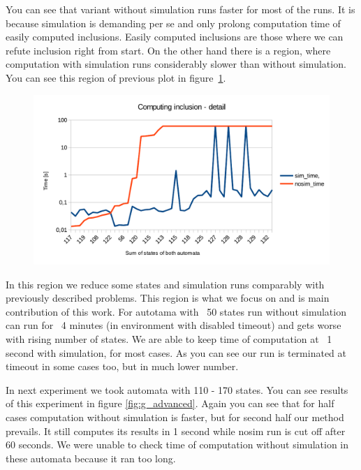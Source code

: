 \documentclass[a4paper, 12pt]{article}
\begin{document}
You can see that variant without simulation runs faster for most of the runs. It is because simulation is demanding per se and only prolong computation time of easily computed inclusions. Easily computed inclusions are those where we can refute inclusion right from start. On the other hand there is a region, where computation with simulation runs considerably slower than without simulation. You can see this region of previous plot in figure~\ref{fig:g_detail}.

\begin{figure}[h!]
	\centering
	\includegraphics{g_detail}
	\caption{}
	\label{fig:g_detail}
\end{figure}

In this region we reduce some states and simulation runs comparably with previously described problems. This region is what we focus on and is main contribution of this work. For autotama with ~50 states run without simulation can run for ~4 minutes (in environment with disabled timeout) and gets worse with rising number of states. We are able to keep time of computation at ~1 second with simulation, for most cases. As you can see our run is terminated at timeout in some cases too, but in much lower number.

In next experiment we took automata with 110 - 170 states. You can see results of this experiment in figure \ref{fig:g_advanced}. Again you can see that for half cases computation without simulation is faster, but for second half our method  prevails. It still computes its results in 1 second while nosim run is cut off after 60 seconds. We were unable to check time of computation without simulation in these automata because it ran too long.
\end{document}
